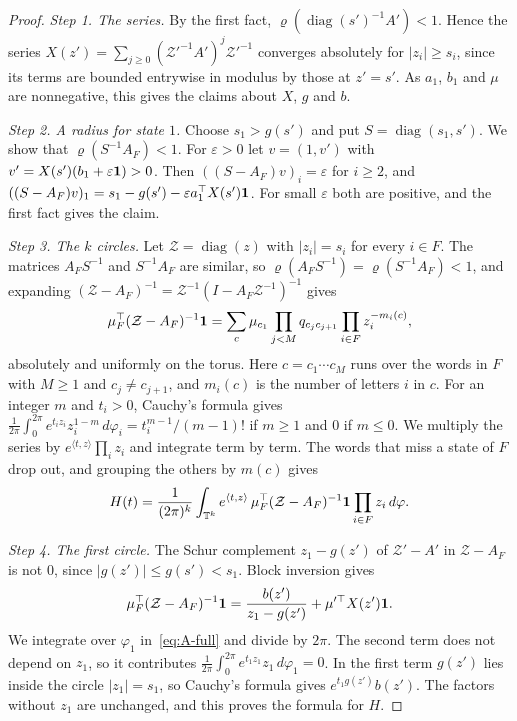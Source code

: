 \begin{proof}
\emph{Step 1. The series.} By the first fact,
$\varrho(\operatorname{diag}(s')^{-1}A')<1$. Hence the series
$X(z')=\sum_{j\ge0}(\mathcal Z'^{-1}A')^j\mathcal Z'^{-1}$ converges
absolutely for $|z_i|\ge s_i$, since its terms are bounded
entrywise in modulus by those at $z'=s'$. As $a_1$, $b_1$ and $\mu$ are
nonnegative, this gives the claims about $X$, $g$ and $b$.

\emph{Step 2. A radius for state $1$.} Choose $s_1>g(s')$ and put
$S=\operatorname{diag}(s_1,s')$. We show that $\varrho(S^{-1}A_F)<1$. For
$\varepsilon>0$ let $v=(1,v')$ with
$v'=X(s')(b_1+\varepsilon\mathbf{1})>0$. Then $((S-A_F)v)_i=\varepsilon$ for
$i\ge2$, and $((S-A_F)v)_1=s_1-g(s')-\varepsilon a_1^\top X(s')\mathbf{1}$. For
small $\varepsilon$ both are positive, and the first fact gives the claim.

\emph{Step 3. The $k$ circles.} Let $\mathcal Z=\operatorname{diag}(z)$ with
$|z_i|=s_i$ for every $i\in F$. The matrices $A_FS^{-1}$ and $S^{-1}A_F$ are similar, so
$\varrho(A_FS^{-1})=\varrho(S^{-1}A_F)<1$, and expanding
$(\mathcal Z-A_F)^{-1}=\mathcal Z^{-1}(I-A_F\mathcal Z^{-1})^{-1}$ gives
\[
\mu_F^\top(\mathcal Z-A_F)^{-1}\mathbf{1}=\sum_c\mu_{c_1}\prod_{j<M}q_{c_jc_{j+1}}
\prod_{i\in F}z_i^{-m_i(c)},
\]
absolutely and uniformly on the torus. Here $c=c_1\cdots c_M$ runs over the
words in $F$ with $M\ge1$ and $c_j\ne c_{j+1}$, and $m_i(c)$ is the number of
letters $i$ in $c$. For an integer $m$ and $t_i>0$, Cauchy's formula gives
$\frac1{2\pi}\int_0^{2\pi}e^{t_iz_i}z_i^{1-m}\,d\varphi_i=t_i^{m-1}/(m-1)!$ if
$m\ge1$ and $0$ if $m\le0$. We multiply the series by
$e^{\langle t,z\rangle}\prod_iz_i$ and integrate term by term. The words that
miss a state of $F$ drop out, and grouping the others by $m(c)$ gives
\begin{equation}\label{eq:A-full}
H(t)=\frac1{(2\pi)^k}\int_{\mathbb T^k}e^{\langle t,z\rangle}\,
\mu_F^\top(\mathcal Z-A_F)^{-1}\mathbf{1}\prod_{i\in F}z_i\,d\varphi .
\end{equation}

\emph{Step 4. The first circle.} The Schur complement $z_1-g(z')$ of
$\mathcal Z'-A'$ in $\mathcal Z-A_F$ is not $0$, since
$|g(z')|\le g(s')<s_1$. Block inversion gives
\[
\mu_F^\top(\mathcal Z-A_F)^{-1}\mathbf{1}=\frac{b(z')}{z_1-g(z')}
+\mu'^\top X(z')\mathbf{1} .
\]
We integrate over $\varphi_1$ in~\eqref{eq:A-full} and divide by $2\pi$. The
second term does not depend on $z_1$, so it contributes
$\frac1{2\pi}\int_0^{2\pi}e^{t_1z_1}z_1\,d\varphi_1=0$. In the first term
$g(z')$ lies inside the circle $|z_1|=s_1$, so Cauchy's formula gives
$e^{t_1g(z')}b(z')$. The factors without $z_1$ are unchanged, and this proves
the formula for $H$.


\end{proof}
